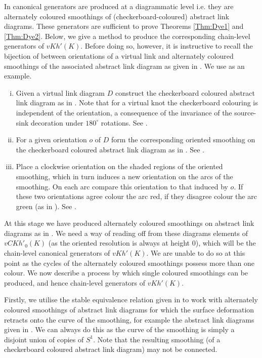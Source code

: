 \documentclass[10pt,oneside]{amsart}
\theoremstyle{definition}
\numberwithin{equation}{section}
\begin{document}
In \cite{Dye2014} canonical generators are produced at a diagrammatic level i.e. they are alternately coloured smoothings of (checkerboard-coloured) abstract link diagrams. These generators are sufficient to prove Theorems \ref{Thm:Dye1} and \ref{Thm:Dye2}. Below, we give a method to produce the corresponding chain-level generators of \( {vKh}' ( K )\). Before doing so, however, it is instructive to recall the bijection of  between orientations of a virtual link and alternately coloured smoothings of the associated abstract link diagram as given in \cite{Dye2014}. We use  as an example.
\begin{enumerate}[(i)]
	\item Given a virtual link diagram \( D \) construct the checkerboard coloured abstract link diagram as in . Note that for a virtual knot the checkerboard colouring is independent of the orientation, a consequence of the invariance of the source-sink decoration under \( 180^{\circ} \) rotations. See .
	\item For a given orientation \( o \) of \( D \) form the corresponding oriented smoothing on the checkerboard coloured abstract link diagram as in . See .
	\item\label{part3} Place a clockwise orientation on the shaded regions of the oriented smoothing, which in turn induces a new orientation on the arcs of the smoothing. On each arc compare this orientation to that induced by \( o \). If these two orientations agree colour the arc red, if they disagree colour the arc green (as in ). See .
\end{enumerate}
At this stage we have produced alternately coloured smoothings on abstract link diagrams as in . We need a way of reading off from these diagrams elements of \( {{vCKh} '}_0 ( K ) \) (as the oriented resolution is always at height \( 0 \)), which will be the chain-level canonical generators of \( {vKh} ' ( K ) \). We are unable to do so at this point as the cycles of the alternately coloured smoothings possess more than one colour. We now describe a process by which single coloured smoothings can be produced, and hence chain-level generators of \( {vKh} ' ( K ) \).

Firstly, we utilise the stable equivalence relation given in  to work with alternately coloured smoothings of abstract link diagrams for which the surface deformation retracts onto the curve of the smoothing, for example the abstract link diagrams given in . We can always do this as the curve of the smoothing is simply a disjoint union of copies of \( S^1 \). Note that the resulting smoothing (of a checkerboard coloured abstract link diagram) may not be connected.
\end{document}
